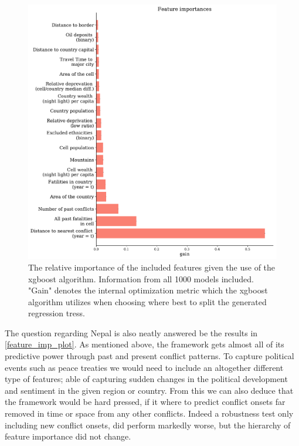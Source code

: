 \documentclass[a4paper]{article}
\begin{document}
\begin{figure}[!htb]
	\centering
	\includegraphics[scale=0.5]{feature_imp.pdf}
    \caption{\footnotesize{The relative importance of the included features given the use of the xgboost algorithm. Information from all 1000 models included. "Gain" denotes the internal optimization metric which the xgboost algorithm utilizes when choosing where best to split the generated regression tress.}}\label{feature_imp_plot}
\end{figure}

The question regarding Nepal is also neatly answered be the results in \autoref{feature_imp_plot}. As mentioned above, the framework gets almost all of its predictive power through past and present conflict patterns. To capture political events such as peace treaties we would need to include an altogether different type of features; able of capturing sudden changes in the political development and sentiment in the given region or country. From this we can also deduce that the framework would be hard pressed, if it where to predict conflict onsets far removed in time or space from any other conflicts. Indeed a robustness test only including new conflict onsets, did perform markedly worse, but the hierarchy of feature importance did not change.\par
\end{document}
